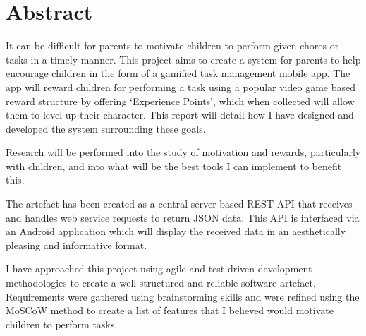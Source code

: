 \chapter*{Abstract}
It can be difficult for parents to motivate children to perform given chores or tasks in a timely manner.
This project aims to create a system for parents to help encourage children in the form of a gamified task management mobile app.
The app will reward children for performing a task using a popular video game based reward structure by offering `Experience Points', which when collected will allow them to level up their character.  
This report will detail how I have designed and developed the system surrounding these goals.

Research will be performed into the study of motivation and rewards, particularly with children, and into what will be the best tools I can implement to benefit this.

The artefact has been created as a central server based REST API that receives and handles web service requests to return JSON data.
This API is interfaced via an Android application which will display the received data in an aesthetically pleasing and informative format.

I have approached this project using agile and test driven development methodologies to create a well structured and reliable software artefact.
Requirements were gathered using brainstorming skills and were refined using the MoSCoW method to create a list of features that I believed would motivate children to perform tasks.

